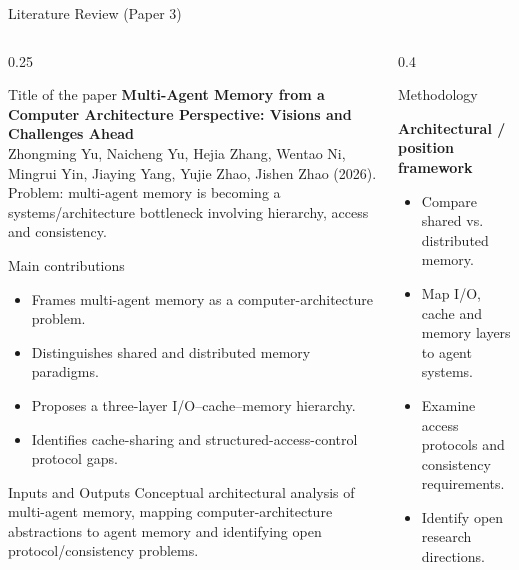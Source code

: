 \begin{frame}{Literature Review (Paper 3)}
\begin{columns}[T]
  \begin{column}{0.25\textwidth}
    \begin{block}{Title of the paper \cite{memoryarch26}}
      \tiny \textbf{Multi-Agent Memory from a Computer Architecture Perspective: Visions and Challenges Ahead}\\[2pt] Zhongming Yu, Naicheng Yu, Hejia Zhang, Wentao Ni, Mingrui Yin, Jiaying Yang, Yujie Zhao, Jishen Zhao (2026).\\[2pt] Problem: multi-agent memory is becoming a systems/architecture bottleneck involving hierarchy, access and consistency.
    \end{block}
    \vspace{0.12cm}
    \begin{block}{Main contributions}
      \tiny
      \begin{itemize}\setlength\itemsep{1pt}
      \item Frames multi-agent memory as a computer-architecture problem.
\item Distinguishes shared and distributed memory paradigms.
\item Proposes a three-layer I/O--cache--memory hierarchy.
\item Identifies cache-sharing and structured-access-control protocol gaps.
      \end{itemize}
    \end{block}
    \vspace{0.12cm}
    \begin{block}{Inputs and Outputs}
      \tiny Conceptual architectural analysis of multi-agent memory, mapping computer-architecture abstractions to agent memory and identifying open protocol/consistency problems.
    \end{block}
  \end{column}

  \begin{column}{0.4\textwidth}
    \begin{block}{Methodology}
    \tiny
    \begin{center}
    \textbf{Architectural / position framework}
    \end{center}
    \begin{itemize}\setlength\itemsep{1pt}
    \item Compare shared vs. distributed memory.
\item Map I/O, cache and memory layers to agent systems.
\item Examine access protocols and consistency requirements.
\item Identify open research directions.
    \end{itemize}
    \end{block}


\end{column}
\end{columns}
\end{frame}
